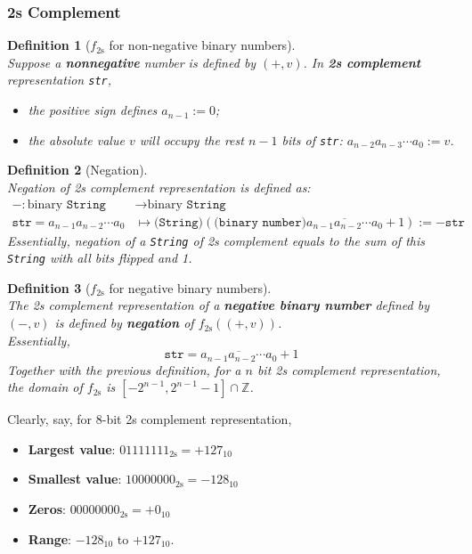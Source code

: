\documentclass[12pt]{article}
\newtheorem{definition}{Definition}[section]
\theoremstyle{definition}
\begin{document}
\subsubsection{2s Complement}
\begin{definition}[$f_\text{2s}$ for non-negative binary numbers]
\hfill\\\normalfont
Suppose a \textbf{nonnegative} number is defined by $(+,v)$. In \textbf{2s complement} representation \texttt{str}, 
\begin{itemize}
\item the positive sign defines $a_{n-1}:=0$;
\item the absolute value $v$ will occupy the rest $n-1$ bits of \texttt{str}: $a_{n-2}a_{n-3}\cdots a_0:=v$.
\end{itemize}
\end{definition}
\begin{definition}[Negation]
\hfill\\\normalfont Negation of 2s complement representation is defined as:
\begin{align*}
-:\text{binary }\texttt{String}&\to \text{binary }\texttt{String}\\
\texttt{str}=a_{n-1}a_{n-2}\cdots a_0&\mapsto \texttt{(String)}(\texttt{(binary number)}\overline{a_{n-1}a_{n-2}\cdots a_0}+1):=-\texttt{str}
\end{align*}
Essentially, negation of a \texttt{String} of 2s complement equals to the sum of this \texttt{String} with all bits flipped and 1.
\end{definition}
\begin{definition}[$f_\text{2s}$ for negative binary numbers]
\hfill\\\normalfont
The 2s complement representation of a \textbf{negative binary number} defined by $(-,v)$ is defined by \textbf{negation} of $f_\text{2s}((+,v))$.\\
Essentially,
\[
\texttt{str}= \overline{a_{n-1}a_{n-2}\cdots a_0}+1
\]
Together with the previous definition, for a $n$ bit 2s complement representation, the domain of $f_\text{2s}$ is $[-2^{n-1},2^{n-1}-1]\cap\mathbb{Z}$.
\end{definition}
Clearly, say, for 8-bit 2s complement representation,
\begin{itemize}
  \item \textbf{Largest value}: $01111111_{\text{2s}} = +127_{10}$
  \item \textbf{Smallest value}: $10000000_{\text{2s}}=-128_{10}$
  \item \textbf{Zeros}: $00000000_\text{2s}=+0_{10}$
  \item \textbf{Range}: $-128_{10}$ to $+127_{10}$.
\end{itemize}
\end{document}
